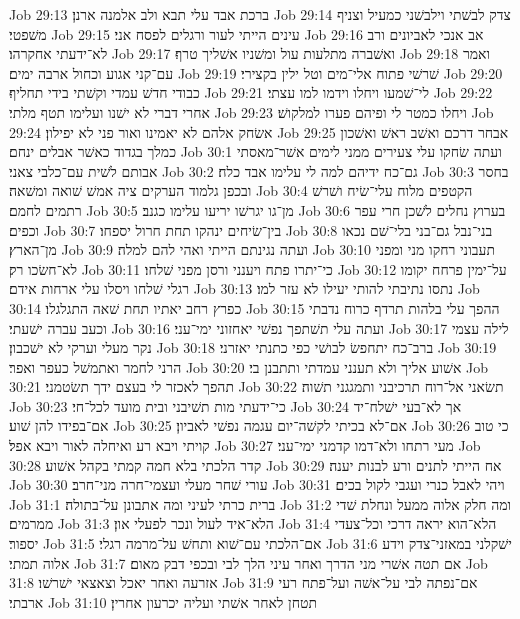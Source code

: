 Job 29:13  ברכת אבד עלי תבא ולב אלמנה ארנן׃
Job 29:14  צדק לבשׁתי וילבשׁני כמעיל וצניף משׁפטי׃
Job 29:15  עינים הייתי לעור ורגלים לפסח אני׃
Job 29:16  אב אנכי לאביונים ורב לא־ידעתי אחקרהו׃
Job 29:17  ואשׁברה מתלעות עול ומשׁניו אשׁליך טרף׃
Job 29:18  ואמר עם־קני אגוע וכחול ארבה ימים׃
Job 29:19  שׁרשׁי פתוח אלי־מים וטל ילין בקצירי׃
Job 29:20  כבודי חדשׁ עמדי וקשׁתי בידי תחליף׃
Job 29:21  לי־שׁמעו ויחלו וידמו למו עצתי׃
Job 29:22  אחרי דברי לא ישׁנו ועלימו תטף מלתי׃
Job 29:23  ויחלו כמטר לי ופיהם פערו למלקושׁ׃
Job 29:24  אשׂחק אלהם לא יאמינו ואור פני לא יפילון׃
Job 29:25  אבחר דרכם ואשׁב ראשׁ ואשׁכון כמלך בגדוד כאשׁר אבלים ינחם׃
Job 30:1  ועתה שׂחקו עלי צעירים ממני לימים אשׁר־מאסתי אבותם לשׁית עם־כלבי צאני׃
Job 30:2  גם־כח ידיהם למה לי עלימו אבד כלח׃
Job 30:3  בחסר ובכפן גלמוד הערקים ציה אמשׁ שׁואה ומשׁאה׃
Job 30:4  הקטפים מלוח עלי־שׂיח ושׁרשׁ רתמים לחמם׃
Job 30:5  מן־גו יגרשׁו יריעו עלימו כגנב׃
Job 30:6  בערוץ נחלים לשׁכן חרי עפר וכפים׃
Job 30:7  בין־שׂיחים ינהקו תחת חרול יספחו׃
Job 30:8  בני־נבל גם־בני בלי־שׁם נכאו מן־הארץ׃
Job 30:9  ועתה נגינתם הייתי ואהי להם למלה׃
Job 30:10  תעבוני רחקו מני ומפני לא־חשׂכו רק׃
Job 30:11  כי־יתרו פתח ויענני ורסן מפני שׁלחו׃
Job 30:12  על־ימין פרחח יקומו רגלי שׁלחו ויסלו עלי ארחות אידם׃
Job 30:13  נתסו נתיבתי להותי יעילו לא עזר למו׃
Job 30:14  כפרץ רחב יאתיו תחת שׁאה התגלגלו׃
Job 30:15  ההפך עלי בלהות תרדף כרוח נדבתי וכעב עברה ישׁעתי׃
Job 30:16  ועתה עלי תשׁתפך נפשׁי יאחזוני ימי־עני׃
Job 30:17  לילה עצמי נקר מעלי וערקי לא ישׁכבון׃
Job 30:18  ברב־כח יתחפשׂ לבושׁי כפי כתנתי יאזרני׃
Job 30:19  הרני לחמר ואתמשׁל כעפר ואפר׃
Job 30:20  אשׁוע אליך ולא תענני עמדתי ותתבנן בי׃
Job 30:21  תהפך לאכזר לי בעצם ידך תשׂטמני׃
Job 30:22  תשׂאני אל־רוח תרכיבני ותמגגני תשׁוה׃
Job 30:23  כי־ידעתי מות תשׁיבני ובית מועד לכל־חי׃
Job 30:24  אך לא־בעי ישׁלח־יד אם־בפידו להן שׁוע׃
Job 30:25  אם־לא בכיתי לקשׁה־יום עגמה נפשׁי לאביון׃
Job 30:26  כי טוב קויתי ויבא רע ואיחלה לאור ויבא אפל׃
Job 30:27  מעי רתחו ולא־דמו קדמני ימי־עני׃
Job 30:28  קדר הלכתי בלא חמה קמתי בקהל אשׁוע׃
Job 30:29  אח הייתי לתנים ורע לבנות יענה׃
Job 30:30  עורי שׁחר מעלי ועצמי־חרה מני־חרב׃
Job 30:31  ויהי לאבל כנרי ועגבי לקול בכים׃
Job 31:1  ברית כרתי לעיני ומה אתבונן על־בתולה׃
Job 31:2  ומה חלק אלוה ממעל ונחלת שׁדי ממרמים׃
Job 31:3  הלא־איד לעול ונכר לפעלי און׃
Job 31:4  הלא־הוא יראה דרכי וכל־צעדי יספור׃
Job 31:5  אם־הלכתי עם־שׁוא ותחשׁ על־מרמה רגלי׃
Job 31:6  ישׁקלני במאזני־צדק וידע אלוה תמתי׃
Job 31:7  אם תטה אשׁרי מני הדרך ואחר עיני הלך לבי ובכפי דבק מאום׃
Job 31:8  אזרעה ואחר יאכל וצאצאי ישׁרשׁו׃
Job 31:9  אם־נפתה לבי על־אשׁה ועל־פתח רעי ארבתי׃
Job 31:10  תטחן לאחר אשׁתי ועליה יכרעון אחרין׃
